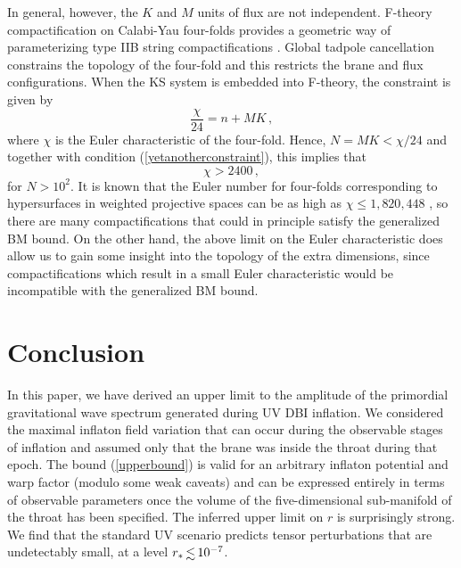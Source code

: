 In general, however, the $K$ and $M$ units of flux are not independent. 
F-theory compactification on Calabi-Yau four-folds
provides a geometric way of parameterizing  
type IIB string compactifications
\cite{witten1,witten2,witten3,sethi,gkp,klemm}. 
Global tadpole cancellation constrains the topology of the four-fold
and this restricts the brane and flux configurations.  
When the KS system is embedded into F-theory, the  
constraint is given by \cite{gkp}
\begin{equation}
\label{Ftheory}
\frac{\chi}{24} = n + MK \,,
\end{equation}
where $\chi$ is the Euler characteristic of the four-fold.  
Hence, $N = MK < \chi /24$ and together with condition 
(\ref{yetanotherconstraint}), this implies that
\begin{equation}
\label{chilimit}
\chi > 2400 \,,
\end{equation}
for $N > 10^2$.
It is known that the Euler number for four-folds 
corresponding to hypersurfaces in weighted projective spaces
can be as high as $\chi \le 1,820,448$ \cite{klemm},
so there are many compactifications that could 
in principle satisfy the generalized BM bound.
On the other hand, the above limit on the Euler characteristic 
does allow us to gain some insight into the 
topology of the extra dimensions, since compactifications 
which result in a small Euler characteristic would be  
incompatible with the generalized BM bound. 
% 
% 
% 
% 
% 
% 
\section{Conclusion} 
% 
\label{Conclusion}

In this paper, we have derived an upper limit to
the amplitude of the primordial gravitational wave spectrum
generated during UV DBI inflation. We considered   
the maximal inflaton field variation   
that can occur during the observable stages of inflation and assumed  
only that the brane was inside the throat during that epoch. 
The bound (\ref{upperbound}) is valid for an arbitrary inflaton potential and 
warp factor (modulo some weak caveats) and can be expressed 
entirely in terms of observable parameters once the volume of 
the five-dimensional sub-manifold of the throat has been specified. 
The inferred upper limit on $r$ is surprisingly strong. 
We find that the standard UV  
scenario predicts tensor perturbations that are undetectably small, 
at a level ${r_*} \, {\lsim} \, {10^{-7}}$. 

